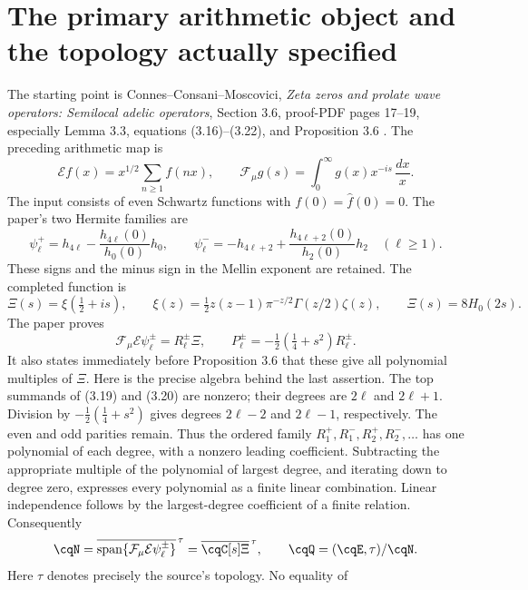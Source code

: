 \section{The primary arithmetic object and the topology actually specified}
\label{sec:cq-source}
The starting point is Connes--Consani--Moscovici,
\emph{Zeta zeros and prolate wave operators: Semilocal adelic operators},
Section 3.6, proof-PDF pages 17--19, especially Lemma 3.3,
equations (3.16)--(3.22), and Proposition 3.6
\cite{cqCCM}. The preceding arithmetic map is
\[
 \mathcal E f(x)=x^{1/2}\sum_{n\geq1}f(nx),\qquad
 \mathcal F_\mu g(s)=\int_0^\infty g(x)x^{-is}\,\frac{dx}{x}.
\]
The input consists of even Schwartz functions with
$f(0)=\widehat f(0)=0$. The paper's two Hermite families are
\[
 \psi_\ell^+=h_{4\ell}-\frac{h_{4\ell}(0)}{h_0(0)}h_0,
 \qquad
 \psi_\ell^-=-h_{4\ell+2}
       +\frac{h_{4\ell+2}(0)}{h_2(0)}h_2\quad(\ell\geq1).
\]
These signs and the minus sign in the Mellin exponent are retained.
The completed function is
\begin{equation}\label{eq:cq-Xi}
 \Xi(s)=\xi(\tfrac12+is),\qquad
 \xi(z)=\tfrac12z(z-1)\pi^{-z/2}\Gamma(z/2)\zeta(z),
 \qquad \Xi(s)=8H_0(2s).
\end{equation}
The paper proves
\begin{equation}\label{eq:cq-image}
 \mathcal F_\mu\mathcal E\psi_\ell^\pm=R_\ell^\pm\Xi,
 \qquad P_\ell^\pm=-\tfrac12(\tfrac14+s^2)R_\ell^\pm.
\end{equation}
It also states immediately before Proposition 3.6 that these give all
polynomial multiples of $\Xi$. Here is the precise algebra behind the
last assertion. The top summands of (3.19) and (3.20) are nonzero;
their degrees are $2\ell$ and $2\ell+1$. Division by
$-\tfrac12(\tfrac14+s^2)$ gives degrees $2\ell-2$ and
$2\ell-1$, respectively. The even and odd parities remain.
Thus the ordered family $R_1^+,R_1^-,R_2^+,R_2^-,\ldots$
has one polynomial of each degree, with a nonzero leading coefficient.
Subtracting the appropriate multiple of the polynomial of largest
degree, and iterating down to degree zero, expresses every polynomial
as a finite linear combination. Linear independence follows by the
largest-degree coefficient of a finite relation. Consequently
\begin{equation}\label{eq:cq-N}
 \cqN=\overline{\operatorname{span}
 \{\mathcal F_\mu\mathcal E\psi_\ell^\pm\}}^{\,\tau}
 =\overline{\cqC[s]\Xi}^{\,\tau},\qquad
 \cqQ=(\cqE,\tau)/\cqN.
\end{equation}
Here $\tau$ denotes precisely the source's topology. No equality of
